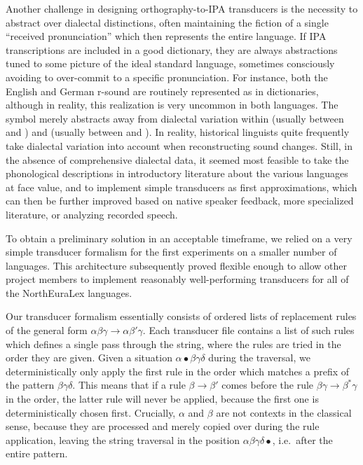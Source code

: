 Another challenge in designing orthography-to-IPA transducers is the necessity to abstract over dialectal distinctions, often maintaining the fiction of a single ``received pronunciation'' which then represents the entire language. If IPA transcriptions are included in a good dictionary, they are always abstractions tuned to some picture of the ideal standard language, sometimes consciously avoiding to over-commit to a specific pronunciation. For instance, both the English and German r-sound are routinely represented as \ipa{[r]} in dictionaries, although in reality, this realization is very uncommon in both languages. The symbol \ipa{[r]} merely abstracts away from dialectal variation within  (usually between \ipa{[R]} and \ipa{[\:R]}) and  (usually between \ipa{[K]} and \ipa{[\;R]}). In reality, historical linguists quite frequently take dialectal variation into account when reconstructing sound changes. Still, in the absence of comprehensive dialectal data, it seemed most feasible to take the phonological descriptions in introductory literature about the various languages at face value, and to implement simple transducers as first approximations, which can then be further improved based on native speaker feedback, more specialized literature, or analyzing recorded speech.

To obtain a preliminary solution in an acceptable timeframe, we relied on a very simple transducer formalism for the first experiments on a smaller number of languages. This architecture subsequently proved flexible enough to allow other project members to implement reasonably well-performing transducers for all of the NorthEuraLex languages.

Our transducer formalism essentially consists of ordered lists of replacement rules of the general form $\alpha\beta\gamma \rightarrow \alpha\beta'\gamma$. Each transducer file contains a list of such rules which defines a single pass through the string, where the rules are tried in the order they are given. Given a situation $\alpha \bullet \beta\gamma\delta$ during the traversal, we deterministically only apply the first rule in the order which matches a prefix of the pattern $\beta\gamma\delta$. This means that if a rule $\beta \rightarrow \beta'$ comes before the rule $\beta\gamma \rightarrow \beta^*\gamma$ in the order, the latter rule will never be applied, because the first one is deterministically chosen first. Crucially, $\alpha$ and $\beta$ are not contexts in the classical sense, because they are processed and merely copied over during the rule application, leaving the string traversal in the position $\alpha\beta\gamma\delta \bullet $, i.e.\ after the entire pattern.

